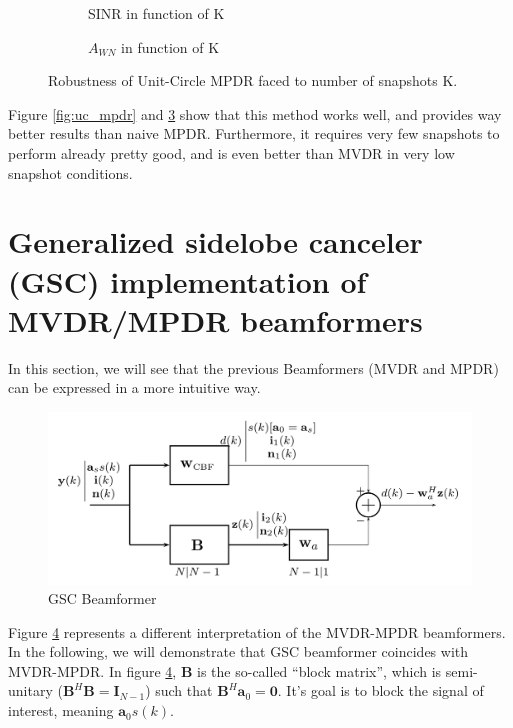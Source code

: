 \documentclass[12pt]{article}
\begin{document}
\begin{figure}[H]
    \centering
    \begin{subfigure}[b]{0.4\linewidth}
        
        \caption{SINR in function of K}
        \label{uc_mpdr_sinr_k}
    \end{subfigure}\hspace{0.09\linewidth}
    \begin{subfigure}[b]{0.4\linewidth}
        
        \caption{$A_{WN}$ in function of K}
        \label{fig:uc_mpdr_awn_k}
    \end{subfigure}
    \caption{Robustness of Unit-Circle MPDR faced to number of snapshots K.}
    \label{fig:uc_mpdr_k}
\end{figure}
Figure \ref{fig:uc_mpdr} and \ref{fig:uc_mpdr_k} show that this method works well, and provides way better results than naive MPDR. Furthermore, it requires very few snapshots to perform already pretty good, and is even better than MVDR in very low snapshot conditions. 
\section{Generalized sidelobe canceler (GSC) implementation of MVDR/MPDR beamformers}
In this section, we will see that the previous Beamformers (MVDR and MPDR) can be expressed in a more intuitive way.
\begin{figure}[H]
    \centering
    \includegraphics[width=.8\linewidth]{paper/figures/gsc_canceller.png}
    \caption{GSC Beamformer}
    \label{fig:gsc_canceller}
\end{figure}
Figure \ref{fig:gsc_canceller} represents a different interpretation of the MVDR-MPDR beamformers. In the following, we will demonstrate that GSC beamformer coincides with MVDR-MPDR. In figure \ref{fig:gsc_canceller}, $\mathbf{B}$ is the so-called ``block matrix'', which is semi-unitary ($\mathbf{B}^H\mathbf{B} = \mathbf{I}_{N-1}$) such that $\mathbf{B}^H\mathbf{a}_0 = \mathbf{0}$. It's goal is to block the signal of interest, meaning $\mathbf{a}_0s(k)$.
\end{document}

